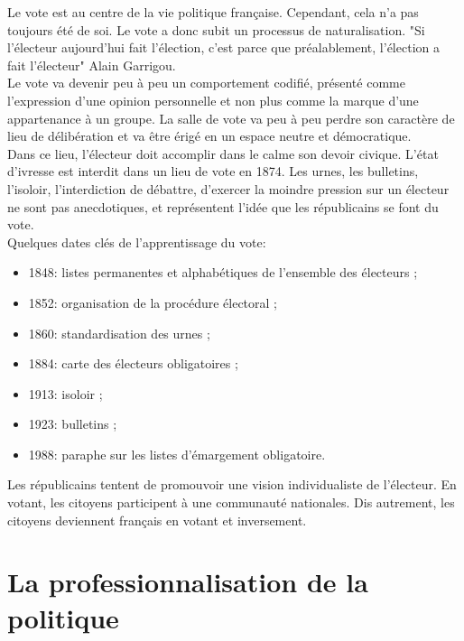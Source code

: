 \documentclass[10pt, a4paper, openany]{book}
\begin{document}
Le vote est au centre de la vie politique française. Cependant, cela n'a pas toujours été de soi. Le vote a donc subit un processus de naturalisation. "Si l'électeur aujourd'hui fait l'élection, c'est parce que préalablement, l'élection a fait l'électeur" Alain Garrigou. \\
Le vote va devenir peu à peu un comportement codifié, présenté comme l'expression d'une opinion personnelle et non plus comme la marque d'une appartenance à un groupe. La salle de vote va peu à peu perdre son caractère de lieu de délibération et va être érigé en un espace neutre et démocratique. \\
Dans ce lieu, l'électeur doit accomplir dans le calme son devoir civique. L'état d'ivresse est interdit dans un lieu de vote en 1874. Les urnes, les bulletins, l'isoloir, l'interdiction de débattre, d'exercer la moindre pression sur un électeur ne sont pas anecdotiques, et représentent l'idée que les républicains se font du vote. \\
Quelques dates clés de l'apprentissage du vote:
\begin{itemize}
\item 1848: listes permanentes et alphabétiques de l'ensemble des électeurs ;
\item 1852: organisation de la procédure électoral ;
\item 1860: standardisation des urnes ;
\item 1884: carte des électeurs obligatoires ;
\item 1913: isoloir ;
\item 1923: bulletins ;
\item 1988: paraphe sur les listes d'émargement obligatoire.
\end{itemize}
Les républicains tentent de promouvoir une vision individualiste de l'électeur. En votant, les citoyens participent à une communauté nationales. Dis autrement, les citoyens deviennent français en votant et inversement.

\section{La professionnalisation de la politique}
\end{document}

